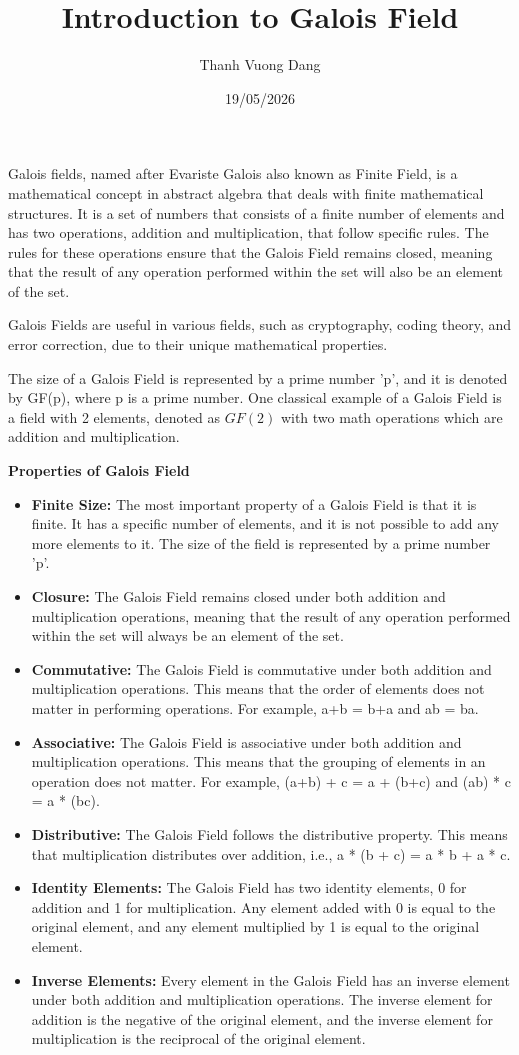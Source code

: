 \documentclass[12pt]{article}
\title{Introduction to Galois Field}
\author{Thanh Vuong Dang}
\date{19/05/2026}
\begin{document}
	\maketitle
	Galois fields,  named after Evariste Galois also known as Finite Field,  is a mathematical concept in abstract algebra that deals with finite mathematical structures. It is a set of numbers that consists of a finite number of elements and has two operations, addition and multiplication, that follow specific rules. The rules for these operations ensure that the Galois Field remains closed, meaning that the result of any operation performed within the set will also be an element of the set.
	
	Galois Fields are useful in various fields, such as cryptography, coding theory, and error correction, due to their unique mathematical properties.
	
	The size of a Galois Field is represented by a prime number 'p', and it is denoted by GF(p), where p is a prime number.
	 One classical example of a Galois Field is a field with 2 elements, denoted as $GF(2)$ with two math operations which are addition and multiplication.
	
	\textbf{Properties of Galois Field}
	\begin{itemize}
		\item[1] \textbf{Finite Size:} The most important property of a Galois Field is that it is finite. It has a specific number of elements, and it is not possible to add any more elements to it. The size of the field is represented by a prime number 'p'.
		\item[2] \textbf{Closure:} The Galois Field remains closed under both addition and multiplication operations, meaning that the result of any operation performed within the set will always be an element of the set.
		\item[3] \textbf{Commutative:} The Galois Field is commutative under both addition and multiplication operations. This means that the order of elements does not matter in performing operations. For example, a+b = b+a and ab = ba.
		\item[4] \textbf{Associative:} The Galois Field is associative under both addition and multiplication operations. This means that the grouping of elements in an operation does not matter. For example, (a+b) + c = a + (b+c) and (ab) * c = a * (bc).
		\item[5] \textbf{Distributive:} The Galois Field follows the distributive property. This means that multiplication distributes over addition, i.e., a * (b + c) = a * b + a * c.
		\item[6] \textbf{Identity Elements:} The Galois Field has two identity elements, 0 for addition and 1 for multiplication. Any element added with 0 is equal to the original element, and any element multiplied by 1 is equal to the original element.
		\item[7] \textbf{Inverse Elements:} Every element in the Galois Field has an inverse element under both addition and multiplication operations. The inverse element for addition is the negative of the original element, and the inverse element for multiplication is the reciprocal of the original element.
	\end{itemize}
\end{document}
